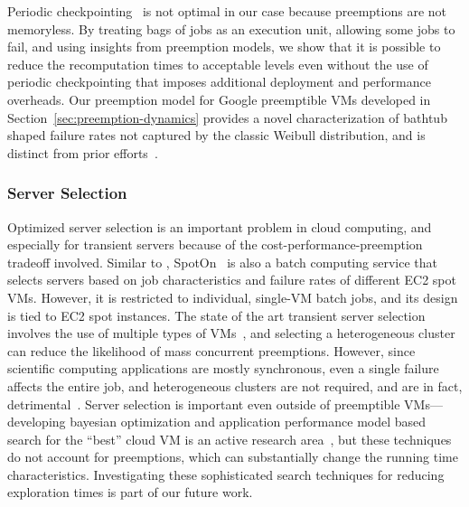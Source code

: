Periodic checkpointing~\cite{dongarra_fault_nodate} is not optimal in our case because preemptions are not memoryless. 
By treating bags of jobs as an execution unit, allowing some jobs to fail, and using insights from preemption models, we show that it is possible to reduce the recomputation times to acceptable levels even without the  use of periodic  checkpointing that imposes additional deployment and performance overheads. 
Our preemption model for Google preemptible VMs developed in Section~\ref{sec:preemption-dynamics} provides a novel characterization of bathtub shaped failure rates not captured by the classic Weibull distribution, and is distinct from prior efforts~\cite{mudholkar1993exponentiated, crevecoeur1993model}. 


\vspace*{\subsecspace}
\subsubsection{Server Selection}

Optimized server selection is an important problem in cloud computing, and especially for transient servers because of the cost-performance-preemption tradeoff involved. 
Similar to \sysname, SpotOn~\cite{spoton} is also a batch computing service that selects servers based on job characteristics and failure rates of different EC2 spot VMs. However, it is restricted to individual, single-VM batch jobs, and its design is tied to EC2 spot instances.
The state of the art transient server selection involves the use of multiple types of VMs~\cite{exosphere}, and selecting a heterogeneous cluster can reduce the likelihood of mass concurrent preemptions.
However, since scientific computing applications are mostly synchronous, even a single failure affects the entire job, and heterogeneous clusters are not required, and are in fact, detrimental~\cite{exosphere}. 
Server selection is important even outside of preemptible VMs---developing bayesian optimization and application performance model based search for the ``best'' cloud VM is an active research area~\cite{alipourfard_cherrypick, yadwadkar_selecting_2017}, but these techniques do not account for preemptions, which can substantially change the running time characteristics. Investigating these sophisticated search techniques for reducing exploration times is part of our future work. 

